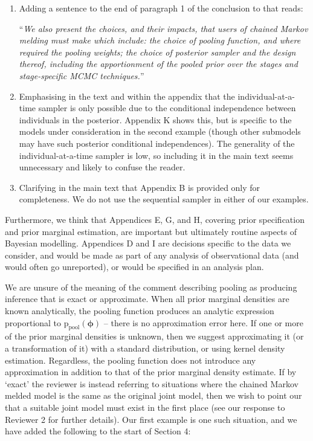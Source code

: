 \documentclass[
  10pt,
  a4paper,
]{article}
\newcommand{\pd}{\text{p}}
\begin{document}
\begin{enumerate}
\def\labelenumi{\arabic{enumi}.}
\item
  Adding a sentence to the end of paragraph 1 of the conclusion to that
  reads:

  ``\emph{We also present the choices, and their impacts, that users of
  chained Markov melding must make which include: the choice of pooling
  function, and where required the pooling weights; the choice of
  posterior sampler and the design thereof, including the apportionment
  of the pooled prior over the stages and stage-specific MCMC
  techniques.}''
\item
  Emphasising in the text and within the appendix that the
  individual-at-a-time sampler is only possible due to the conditional
  independence between individuals in the posterior. Appendix K shows
  this, but is specific to the models under consideration in the second
  example (though other submodels may have such posterior conditional
  independences). The generality of the individual-at-a-time sampler is
  low, so including it in the main text seems unnecessary and likely to
  confuse the reader.
\item
  Clarifying in the main text that Appendix B is provided only for
  completeness. We do not use the sequential sampler in either of our
  examples.
\end{enumerate}

Furthermore, we think that Appendices E, G, and H, covering prior
specification and prior marginal estimation, are important but
ultimately routine aspects of Bayesian modelling. Appendices D and I are
decisions specific to the data we consider, and would be made as part of
any analysis of observational data (and would often go unreported), or
would be specified in an analysis plan.

We are unsure of the meaning of the comment describing pooling as
producing inference that is exact or approximate. When all prior
marginal densities are known analytically, the pooling function produces
an analytic expression proportional to
\(\pd_{\text{pool}}(\boldsymbol{\phi})\) -- there is no approximation
error here. If one or more of the prior marginal densities is unknown,
then we suggest approximating it (or a transformation of it) with a
standard distribution, or using kernel density estimation. Regardless,
the pooling function does not introduce any approximation in addition to
that of the prior marginal density estimate. If by `exact' the reviewer
is instead referring to situations where the chained Markov melded model
is the same as the original joint model, then we wish to point our that
a suitable joint model must exist in the first place (see our response
to Reviewer 2 for further details). Our first example is one such
situation, and we have added the following to the start of Section 4:
\end{document}
